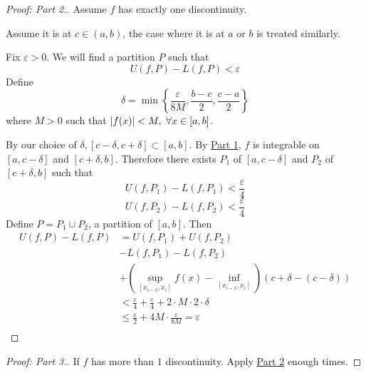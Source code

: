 \documentclass[12pt]{report}
\begin{document}
    \label{Part 2}
    \begin{proof}[Proof: Part \textnormal{2.}]
        Assume \(f\) has exactly one discontinuity.

        Assume it is at \(c \in (a,b)\), the case where it is at \(a\) or \(b\) is treated similarly.

        Fix \(\varepsilon > 0\). We will find a partition \(P\) such that
        \[U(f,P) - L(f,P) < \varepsilon\]
        Define
        \[\delta = \min \left\{\frac{\varepsilon}{8M}, \frac{b-c}{2}, \frac{c-a}{2}\right\}\]
        where \(M >0\) such that \(\left| f(x) \right| < M, ~ \forall x \in [a,b]\).

        By our choice of \(\delta, [c - \delta, c + \delta] \subset [a,b]\). By \hyperref[Part 1.]{Part 1}, \(f\) is integrable on \([a,c -\delta]\) and \([c+\delta, b]\). Therefore there exists \(P_1\) of \([a, c - \delta]\) and \(P_2\) of \([c+ \delta, b]\) such that
        \[U(f,P_1) - L(f,P_1) < \frac{\varepsilon}{4}\]
        \[U(f,P_2) - L(f,P_2) < \frac{\varepsilon}{4}\]
        Define \(P = P_1 \cup P_2\), a partition of \([a,b]\). Then
        \begin{align*}
            U(f,P) - L(f,P) &= U(f,P_1) + U(f,P_2) \\
            &- L(f,P_1) - L(f,P_2) \\
            &+ \left(\underset{[x_{i-1}, x_i]}{\sup} f(x) - \underset{[x_{i-1}, x_i]}{\inf}\right)(c + \delta - (c - \delta))\\
            &< \frac{\varepsilon}{4} + \frac{\varepsilon}{4} +2 \cdot M \cdot 2 \cdot \delta\\
            &\leq \frac{\varepsilon}{2} + 4M \cdot \frac{\varepsilon}{8M} = \varepsilon\\
        \end{align*}
    \end{proof}
    \begin{proof}[Proof: Part \textnormal{3}.]
        If \(f\) has more than \(1\) discontinuity. Apply \hyperref[Part 2]{Part 2} enough times.
    \end{proof}
\end{document}
